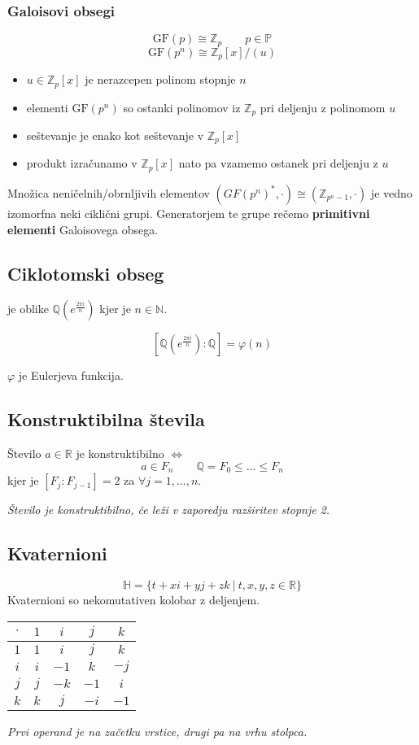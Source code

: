 \subsubsection*{Galoisovi obsegi}
\[\text{GF}(p) \cong \mathbb{Z}_p \qquad p \in \mathbb{P}\]
\[ \text{GF}(p^n) \cong \mathbb{Z}_p[x]/(u) \]
\begin{itemize}
	\item $u \in \mathbb{Z}_p[x]$ je nerazcepen polinom stopnje $n$
	\item elementi $\text{GF}(p^n)$ so ostanki polinomov iz $\mathbb{Z}_p$ pri deljenju z polinomom $u$
	\item seštevanje je enako kot seštevanje v $\mathbb{Z}_p[x]$
	\item produkt izračunamo v $\mathbb{Z}_p[x]$ nato pa vzamemo ostanek pri deljenju z $u$
\end{itemize}

Množica neničelnih/obrnljivih elementov $(GF(p^n)^*, \cdot) \cong (\mathbb{Z}_{p^n-1}, \cdot)$ je vedno izomorfna neki ciklični grupi.
Generatorjem te grupe rečemo \textbf{primitivni elementi} Galoisovega obsega.

\subsection*{Ciklotomski obseg}
je oblike $\mathbb{Q}(e^{\frac{2 \pi i}{n}})$ kjer je $n \in \mathbb{N}$.

\[ [\mathbb{Q}(e^{\frac{2 \pi i}{n}}) : \mathbb{Q}] = \varphi(n) \]

$\varphi$ je Eulerjeva funkcija.

\subsection*{Konstruktibilna števila}
Število $a \in \mathbb{R}$ je konstruktibilno $\iff$
\[a \in F_n \qquad \mathbb{Q} = F_0 \leq \dots \leq F_n\]
kjer je $[F_j : F_{j-1}] = 2$ za $\forall j = 1, \dots, n$.

\emph{Število je konstruktibilno, če leži v zaporedju razširitev stopnje 2.}

\subsection*{Kvaternioni}
\[ \mathbb{H} = \{t+xi+yj+zk\ |\ t,x,y,z \in \mathbb{R}\}\]
Kvaternioni so nekomutativen kolobar z deljenjem.
\begin{center}
	\renewcommand{\arraystretch}{1.5}
	\begin{tabular}{c | c c c c}
		$\cdot$ & $1$ & $i $ & $j $ & $k $ \\ \hline
		$1$ & $1$ & $i $ & $j $ & $k $ \\
		$i$ & $i$ & $-1$ & $k $ & $-j$ \\
		$j$ & $j$ & $-k$ & $-1$ & $i $ \\
		$k$ & $k$ & $j $ & $-i$ & $-1$ \\
	\end{tabular}
\end{center}
\emph{Prvi operand je na začetku vrstice, drugi pa na vrhu stolpca.}

